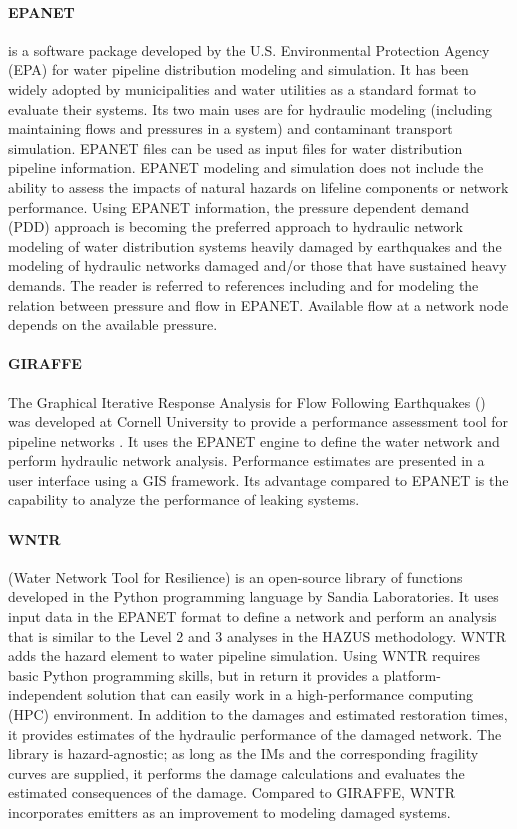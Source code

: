 \paragraph{EPANET}  is a software package developed by the U.S. Environmental Protection Agency (EPA) for water pipeline distribution modeling and simulation. It has been widely adopted by municipalities and water utilities as a standard format to evaluate their systems. Its two main uses are for hydraulic modeling (including maintaining flows and pressures in a system) and contaminant transport simulation. EPANET files can be used as input files for water distribution pipeline information. EPANET modeling and simulation does not include the ability to assess the impacts of natural hazards on lifeline components or network performance. Using EPANET information, the pressure dependent demand (PDD) approach is becoming the preferred approach to hydraulic network modeling of water distribution systems heavily damaged by earthquakes and the modeling of hydraulic networks damaged and/or those that have sustained heavy demands. The reader is referred to references including \citet{jun2013iterative} and \citet{sayyed2014modelling} for modeling the relation between pressure and flow in EPANET. Available flow at a network node depends on the available pressure.

\paragraph{GIRAFFE} The Graphical Iterative Response Analysis for Flow Following Earthquakes () was developed at Cornell University to provide a performance assessment tool for pipeline networks \citep{wang2008seismic}. It uses the EPANET engine to define the water network and perform hydraulic network analysis. Performance estimates are presented in a user interface using a GIS framework. Its advantage compared to EPANET is the capability to analyze the performance of leaking systems.

\paragraph{WNTR}  (Water Network Tool for Resilience) is an open-source library of functions developed in the Python programming language by Sandia Laboratories. It uses input data in the EPANET format to define a network and perform an analysis that is similar to the Level 2 and 3 analyses in the HAZUS methodology. WNTR adds the hazard element to water pipeline simulation. Using WNTR requires basic Python programming skills, but in return it provides a platform-independent solution that can easily work in a high-performance computing (HPC) environment. In addition to the damages and estimated restoration times, it provides estimates of the hydraulic performance of the damaged network. The library is hazard-agnostic; as long as the IMs and the corresponding fragility curves are supplied, it performs the damage calculations and evaluates the estimated consequences of the damage. Compared to GIRAFFE, WNTR incorporates emitters as an improvement to modeling damaged systems.

